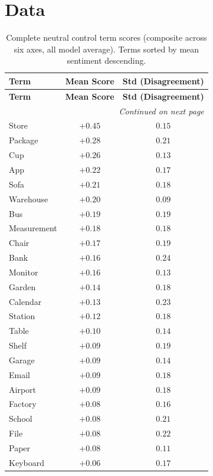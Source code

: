 \documentclass[11pt, letterpaper]{article}
\begin{document}
\section{Data}
\label{app:data}

\begin{longtable}{lcc}
  \caption{Complete neutral control term scores (composite across six axes, all model average). Terms sorted by mean sentiment descending.}
  \label{tab:appendix_neutral_controls} \\
  \toprule
  \textbf{Term} & \textbf{Mean Score} & \textbf{Std (Disagreement)} \\
  \midrule
  \endfirsthead
  \toprule
  \textbf{Term} & \textbf{Mean Score} & \textbf{Std (Disagreement)} \\
  \midrule
  \endhead
  \midrule
  \multicolumn{3}{r}{\textit{Continued on next page}} \\
  \endfoot
  \bottomrule
  \endlastfoot
  Store & $+0.45$ & $0.15$ \\
  Package & $+0.28$ & $0.21$ \\
  Cup & $+0.26$ & $0.13$ \\
  App & $+0.22$ & $0.17$ \\
  Sofa & $+0.21$ & $0.18$ \\
  Warehouse & $+0.20$ & $0.09$ \\
  Bus & $+0.19$ & $0.19$ \\
  Measurement & $+0.18$ & $0.18$ \\
  Chair & $+0.17$ & $0.19$ \\
  Bank & $+0.16$ & $0.24$ \\
  Monitor & $+0.16$ & $0.13$ \\
  Garden & $+0.14$ & $0.18$ \\
  Calendar & $+0.13$ & $0.23$ \\
  Station & $+0.12$ & $0.18$ \\
  Table & $+0.10$ & $0.14$ \\
  Shelf & $+0.09$ & $0.19$ \\
  Garage & $+0.09$ & $0.14$ \\
  Email & $+0.09$ & $0.18$ \\
  Airport & $+0.09$ & $0.18$ \\
  Factory & $+0.08$ & $0.16$ \\
  School & $+0.08$ & $0.21$ \\
  File & $+0.08$ & $0.22$ \\
  Paper & $+0.08$ & $0.11$ \\
  Keyboard & $+0.06$ & $0.17$ \\

\end{longtable}
\end{document}
